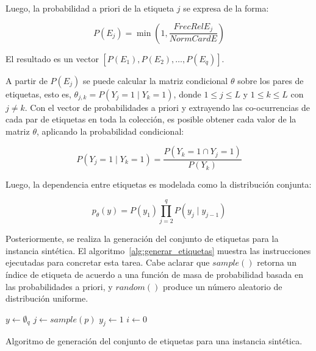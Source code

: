 Luego, la probabilidad a priori de la etiqueta $j$ se expresa de la forma:

\begin{equation}
	P(E_{j}) =\min{(1, \frac{FrecRelE_{j}}{NormCardE})}
\end{equation}

El resultado es un vector $[P(E_{1}), P(E_{2}),\dots, P(E_{q})]$.

A partir de $P(E_{j})$ se puede calcular la matriz condicional $\theta$ sobre
los pares de etiquetas, esto es, $\theta_{j,k} = P(Y_{j} = 1 \mid Y_{k} = 1)$,
donde  $1 \leq j \leq L$ y $1 \leq k \leq L$ con $j \neq k$. Con el vector de
probabilidades a priori y extrayendo las co-ocurrencias de cada par de etiquetas
en toda la colección, es posible obtener cada valor de la matriz $\theta$,
aplicando la probabilidad condicional:

\begin{equation}
	P(Y_{j} = 1 \mid Y_{k} = 1) = \frac{P(Y_{k} = 1 \cap Y_{j} = 1)}{P(Y_{k})}
\end{equation}

Luego, la dependencia entre etiquetas es modelada como la distribución conjunta:

\begin{equation}
	\label{eq:syn_joint}
	p_{\theta}(y) = P(y_{1}) \prod_{j=2}^q P(y_{j} \mid y_{j-1})
\end{equation}

Posteriormente, se realiza la generación del conjunto de etiquetas para la
instancia sintética. El algoritmo~\ref{alg:generar_etiquetas} muestra las
instrucciones ejecutadas para concretar esta tarea. Cabe aclarar que $sample()$
retorna un índice de etiqueta de acuerdo a una función de masa de probabilidad
basada en las probabilidades a priori, y $random()$ produce un número aleatorio
de distribución uniforme.

\begin{center}
	\begin{algorithm}[H]
		\label{alg:generar_etiquetas}
		\SetAlgoLined
		\DontPrintSemicolon
		$y \gets \emptyset_{q}$\;
		$j \gets sample(p)$\;
		$y_{j} \gets 1$\;
		$i \gets 0$ \;
		\caption{Algoritmo de generación del conjunto de etiquetas para una instancia
			sintética.}
	\end{algorithm}
\end{center}


